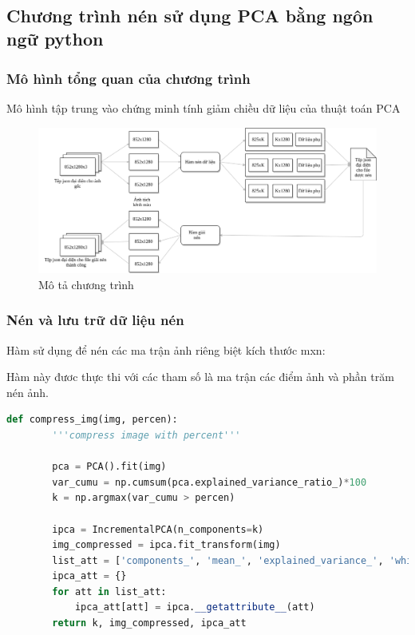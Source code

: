 \
\newpage
\subsection{Chương trình nén sử dụng PCA bằng ngôn ngữ python}
\subsubsection{Mô hình tổng quan của chương trình}

Mô hình tập trung vào chứng minh tính giảm chiều dữ liệu của thuật toán PCA

\begin{center}
    \begin{figure}[htp]
        \begin{center}
            \includegraphics[width=\textwidth,height=\textheight,keepaspectratio]{Chapters/content/27_pca/model.png}
        \end{center}
        \caption{Mô tả chương trình}
        \label{fig:27_6}
    \end{figure}
\end{center}

\subsubsection{Nén và lưu trữ dữ liệu nén}

Hàm sử dụng để nén các ma trận ảnh riêng biệt kích thước mxn:


Hàm này đươc thực thi với các tham số  là ma trận các điểm ảnh và phần trăm nén ảnh.
\newpage
\begin{lstlisting}[language=Python]
    def compress_img(img, percen):
        '''compress image with percent'''

        pca = PCA().fit(img)
        var_cumu = np.cumsum(pca.explained_variance_ratio_)*100
        k = np.argmax(var_cumu > percen)

        ipca = IncrementalPCA(n_components=k)
        img_compressed = ipca.fit_transform(img)
        list_att = ['components_', 'mean_', 'explained_variance_', 'whiten']
        ipca_att = {}
        for att in list_att:
            ipca_att[att] = ipca.__getattribute__(att)
        return k, img_compressed, ipca_att
    
\end{lstlisting}

